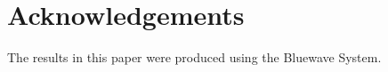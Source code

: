 \section{Acknowledgements}
\label{sec:acknowledgements}

The results in this paper were produced using the Bluewave System.
